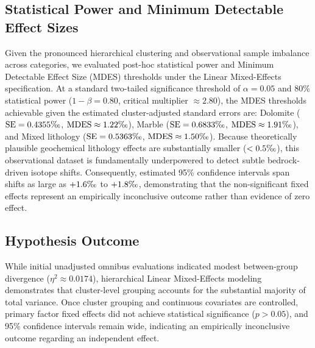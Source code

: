 \documentclass[sn-basic,Numbered]{sn-jnl}%
\begin{document}
\subsection{Statistical Power and Minimum Detectable Effect Sizes}
Given the pronounced hierarchical clustering and observational sample imbalance across categories, we evaluated post-hoc statistical power and Minimum Detectable Effect Size (MDES) thresholds under the Linear Mixed-Effects specification. At a standard two-tailed significance threshold of $\alpha = 0.05$ and 80\% statistical power ($1 - \beta = 0.80$, critical multiplier $\approx 2.80$), the MDES thresholds achievable given the estimated cluster-adjusted standard errors are: Dolomite ($\text{SE} = 0.4355\text{\textperthousand}$, $\text{MDES} \approx 1.22\text{\textperthousand}$), Marble ($\text{SE} = 0.6833\text{\textperthousand}$, $\text{MDES} \approx 1.91\text{\textperthousand}$), and Mixed lithology ($\text{SE} = 0.5363\text{\textperthousand}$, $\text{MDES} \approx 1.50\text{\textperthousand}$). Because theoretically plausible geochemical lithology effects are substantially smaller ($< 0.5\text{\textperthousand}$), this observational dataset is fundamentally underpowered to detect subtle bedrock-driven isotope shifts. Consequently, estimated 95\% confidence intervals span shifts as large as $+1.6\text{\textperthousand}$ to $+1.8\text{\textperthousand}$, demonstrating that the non-significant fixed effects represent an empirically inconclusive outcome rather than evidence of zero effect.

\subsection{Hypothesis Outcome}
While initial unadjusted omnibus evaluations indicated modest between-group divergence ($\eta^2 \approx 0.0174$), hierarchical Linear Mixed-Effects modeling demonstrates that cluster-level grouping accounts for the substantial majority of total variance. Once cluster grouping and continuous covariates are controlled, primary factor fixed effects did not achieve statistical significance ($p > 0.05$), and 95\% confidence intervals remain wide, indicating an empirically inconclusive outcome regarding an independent effect.
\end{document}
